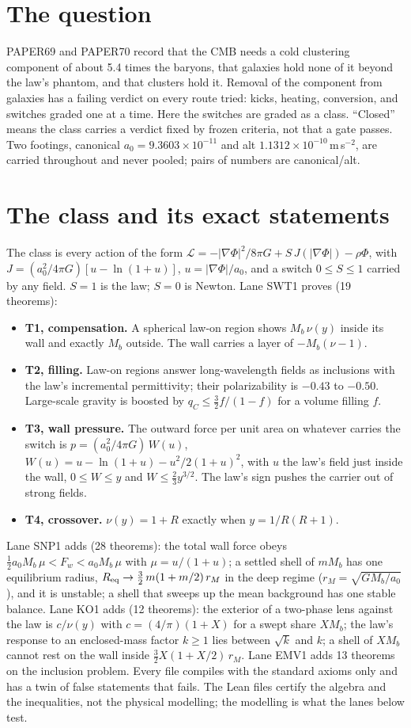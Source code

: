 \documentclass[10pt]{article}
\begin{document}
\section{The question}
PAPER69 and PAPER70 record that the CMB needs a cold clustering component of about 5.4 times the baryons, that galaxies hold none of it beyond the law's phantom, and that clusters hold it. Removal of the component from galaxies has a failing verdict on every route tried: kicks, heating, conversion, and switches graded one at a time.
Here the switches are graded as a class. ``Closed'' means the class carries a verdict fixed by frozen criteria, not that a gate passes. Two footings, canonical $a_0=9.3603\times10^{-11}$ and alt $1.1312\times10^{-10}$\,m\,s$^{-2}$, are carried throughout and never pooled; pairs of numbers are canonical/alt.

\section{The class and its exact statements}
The class is every action of the form
$\mathcal L=-|\nabla\Phi|^2/8\pi G+S\,J(|\nabla\Phi|)-\rho\Phi$, with $J=(a_0^2/4\pi G)[u-\ln(1+u)]$, $u=|\nabla\Phi|/a_0$, and a switch $0\le S\le1$ carried by any field. $S=1$ is the law; $S=0$ is Newton. Lane SWT1 proves (19 theorems):
\begin{itemize}
\item \textbf{T1, compensation.} A spherical law-on region shows $M_b\,\nu(y)$ inside its wall and exactly $M_b$ outside. The wall carries a layer of $-M_b(\nu-1)$.
\item \textbf{T2, filling.} Law-on regions answer long-wavelength fields as inclusions with the law's incremental permittivity; their polarizability is $-0.43$ to $-0.50$. Large-scale gravity is boosted by $q_C\le\tfrac32 f/(1-f)$ for a volume filling $f$.
\item \textbf{T3, wall pressure.} The outward force per unit area on whatever carries the switch is $p=(a_0^2/4\pi G)\,W(u)$, $W(u)=u-\ln(1+u)-u^2/2(1+u)^2$, with $u$ the law's field just inside the wall, $0\le W\le y$ and $W\le\tfrac23y^{3/2}$. The law's sign pushes the carrier out of strong fields.
\item \textbf{T4, crossover.} $\nu(y)=1+R$ exactly when $y=1/R(R+1)$.
\end{itemize}
Lane SNP1 adds (28 theorems): the total wall force obeys $\tfrac12a_0M_b\,\mu<F_w<a_0M_b\,\mu$ with $\mu=u/(1+u)$; a settled shell of $mM_b$ has one equilibrium radius, $R_{\rm eq}\to\tfrac32\,m(1+m/2)\,r_M$ in the deep regime ($r_M=\sqrt{GM_b/a_0}$), and it is unstable; a shell that sweeps up the mean background has one stable balance. Lane KO1 adds (12 theorems): the exterior of a two-phase lens against the law is $c/\nu(y)$ with $c=(4/\pi)(1+X)$ for a swept share $XM_b$; the law's response to an enclosed-mass factor $k\ge1$ lies between $\sqrt k$ and $k$; a shell of $XM_b$ cannot rest on the wall inside $\tfrac32X(1+X/2)\,r_M$. Lane EMV1 adds 13 theorems on the inclusion problem. Every file compiles with the standard axioms only and has a twin of false statements that fails. The Lean files certify the algebra and the inequalities, not the physical modelling; the modelling is what the lanes below test.
\end{document}
